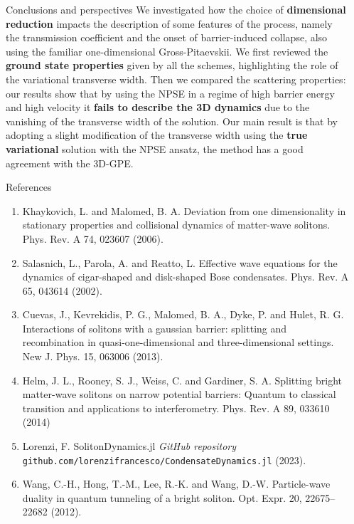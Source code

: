 \documentclass[final]{beamer}
\newlength{\sepwidth}
\newlength{\colwidth}
\newcommand{\separatorcolumn}{\begin{column}{\sepwidth}\end{column}}
\begin{document}
\begin{frame}[t]
\begin{columns}[t]
\begin{column}{\colwidth}
      \begin{block}{Conclusions and perspectives}
        We investigated how the choice of \textbf{dimensional reduction} impacts the description of some features of the process, namely the transmission coefficient and the onset of barrier-induced collapse, also using the familiar one-dimensional Gross-Pitaevskii. We first reviewed the \textbf{ground state properties} given by all the schemes, highlighting the role of the variational transverse width. Then we compared the scattering properties: our results show that by using the NPSE in a regime of high barrier energy and high velocity it \textbf{fails to describe the 3D dynamics} due to the vanishing of the transverse width of the solution. Our main result is that by adopting a slight modification of the transverse width using the \textbf{true variational} solution with the NPSE ansatz, the method has a good agreement with the 3D-GPE.
      \end{block}
      \begin{block}{References}
        \printbibliography[heading=none]          
        \begin{enumerate}
            \item Khaykovich, L. and Malomed, B. A. Deviation from one dimensionality in stationary properties and collisional dynamics of matter-wave solitons. Phys. Rev. A 74, 023607 (2006).
            \item  Salasnich, L., Parola, A. and Reatto, L. Effective wave equations for the dynamics of cigar-shaped and disk-shaped Bose condensates. Phys. Rev. A 65, 043614 (2002).
            \item Cuevas, J., Kevrekidis, P. G., Malomed, B. A., Dyke, P. and Hulet, R. G. Interactions of solitons with a gaussian barrier: splitting and recombination in quasi-one-dimensional and three-dimensional settings. New J. Phys. 15, 063006 (2013). 
            \item Helm, J. L., Rooney, S. J., Weiss, C. and Gardiner, S. A. Splitting bright matter-wave solitons on narrow potential barriers: Quantum to classical transition and applications to interferometry. Phys. Rev. A 89, 033610 (2014)
            \item Lorenzi, F. SolitonDynamics.jl \textit{GitHub repository} \texttt{github.com/lorenzifrancesco/CondensateDynamics.jl} (2023).
            \item Wang, C.-H., Hong, T.-M., Lee, R.-K. and Wang, D.-W. Particle-wave duality in quantum tunneling of a bright soliton. Opt. Expr. 20, 22675–22682 (2012).
        \end{enumerate}
      \end{block}

    \end{column}
    \separatorcolumn
  \end{columns}
\end{frame}
\end{document}
